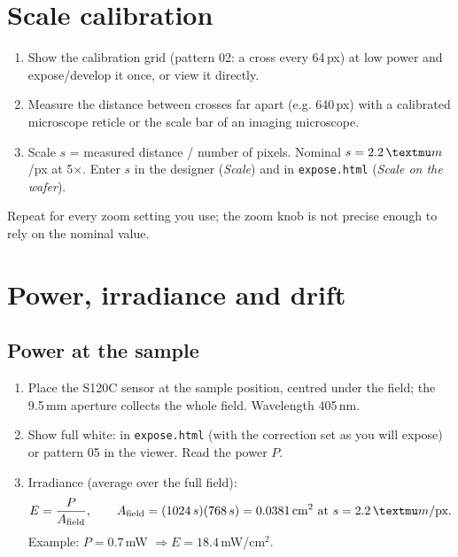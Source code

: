 \documentclass[11pt,a4paper]{article}
\newcommand{\um}{\,\textmu m}
\newcommand{\key}[1]{\fbox{\footnotesize\texttt{#1}}}
\newcommand{\file}[1]{\texttt{#1}}
\begin{document}
\section{Scale calibration}
\label{sec:scale}
\begin{enumerate}
  \item Show the calibration grid (pattern 02: a cross every 64\,px) at low power and expose/develop it once, or
        view it directly.
  \item Measure the distance between crosses far apart (e.g. 640\,px) with a calibrated microscope reticle or the
        scale bar of an imaging microscope.
  \item Scale $s$ = measured distance / number of pixels. Nominal $s = 2.2\um$/px at 5$\times$. Enter $s$ in the
        designer (\emph{Scale}) and in \file{expose.html} (\emph{Scale on the wafer}).
\end{enumerate}
Repeat for every zoom setting you use; the zoom knob is not precise enough to rely on the nominal value.

\section{Power, irradiance and drift}
\label{sec:power}
\subsection{Power at the sample}
\begin{enumerate}
  \item Place the S120C sensor at the sample position, centred under the field; the 9.5\,mm aperture collects the
        whole field. Wavelength 405\,nm.
  \item Show full white: \key{W} in \file{expose.html} (with the correction set as you will expose) or pattern 05 in
        the viewer. Read the power $P$.
  \item Irradiance (average over the full field):
        \begin{equation}
          E = \frac{P}{A_\text{field}}, \qquad A_\text{field} = (1024\,s)(768\,s) = 0.0381\,\text{cm}^2 \text{ at } s = 2.2\um/\text{px}.
        \end{equation}
        Example: $P = 0.7$\,mW $\Rightarrow E = 18.4$\,mW/cm$^2$.
\end{enumerate}
\end{document}

